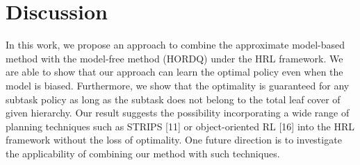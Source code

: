 \chapter{Discussion}
In this work, we propose an approach to combine the approximate model-based method with the
model-free method (HORDQ) under the HRL framework. We are able to show that our approach
can learn the optimal policy even when the model is biased. Furthermore, we show that the optimality
is guaranteed for any subtask policy as long as the subtask does not belong to the total leaf
cover of given hierarchy. Our result suggests the possibility incorporating a wide range of planning
techniques such as STRIPS [11] or object-oriented RL [16] into the HRL framework without the
loss of optimality. One future direction is to investigate the applicability of combining our method
with such techniques.

